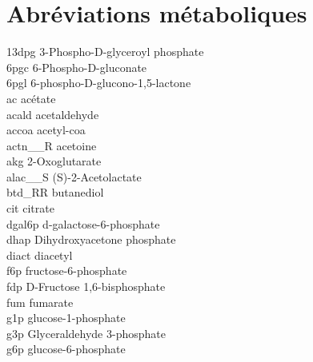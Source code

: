 \section*{Abréviations métaboliques}
\label{abbreviation-metabo}
\noindent
13dpg \hspace{.5em} 3-Phospho-D-glyceroyl phosphate \\
6pgc \hspace{.5em} 6-Phospho-D-gluconate \\
6pgl \hspace{.5em} 6-phospho-D-glucono-1,5-lactone \\
ac \hspace{.5em} acétate \\
acald \hspace{.5em}  acetaldehyde \\
accoa \hspace{.5em} acetyl-coa \\
actn\_\_R \hspace{.5em} acetoine  \\
akg \hspace{.5em}  2-Oxoglutarate \\
alac\_\_S \hspace{.5em} (S)-2-Acetolactate \\
btd\_RR \hspace{.5em}  butanediol \\
cit \hspace{.5em} citrate \\
dgal6p \hspace{.5em} d-galactose-6-phosphate \\
dhap \hspace{.5em} Dihydroxyacetone phosphate \\
diact \hspace{.5em} diacetyl \\
f6p\hspace{.5em} fructose-6-phosphate \\
fdp \hspace{.5em} D-Fructose 1,6-bisphosphate \\
fum \hspace{.5em} fumarate \\
g1p \hspace{.5em} glucose-1-phosphate \\
g3p \hspace{.5em} Glyceraldehyde 3-phosphate \\
g6p \hspace{.5em} glucose-6-phosphate \\
